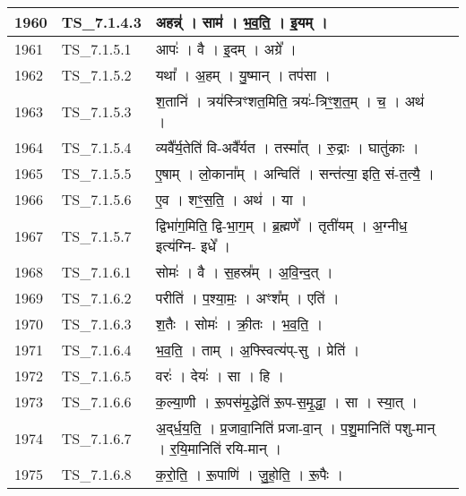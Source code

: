 \documentclass[17pt]{extarticle}
\begin{document}
\begin{longtable}{||p{0.4in}||p{0.9in}||p{4.0in}||p{0.9in}||}
        \hline
            1960 & TS\_7.1.4.3 & अहन्न्॑   ।   साम॑   ।   भ॒व॒ति॒   ।   इ॒यम्   ।    &      \\
        \hline
            1961 & TS\_7.1.5.1 & आपः॑   ।   वै   ।   इ॒दम्   ।   अग्रे᳚   ।    &      \\
        \hline
            1962 & TS\_7.1.5.2 & यथा᳚   ।   अ॒हम्   ।   यु॒ष्मान्   ।   तप॑सा   ।    &      \\
        \hline
            1963 & TS\_7.1.5.3 & श॒तानि॑   ।   त्रय॑स्त्रिꣳशत॒मिति॒ त्रयः॑{-}त्रिꣳ॒॒श॒त॒म्   ।   च॒   ।   अथ॑   ।    &      \\
        \hline
            1964 & TS\_7.1.5.4 & व्यवै᳚र्य॒तेति॑ वि{-}अवै᳚र्यत   ।   तस्मा᳚त्   ।   रु॒द्राः   ।   घातु॑काः   ।    &      \\
        \hline
            1965 & TS\_7.1.5.5 & ए॒षाम्   ।   लो॒काना᳚म्   ।   अन्विति॑   ।   सन्त॑त्या॒ इति॒ सं{-}त॒त्यै॒   ।    &      \\
        \hline
            1966 & TS\_7.1.5.6 & ए॒व   ।   शꣳ॒॒स॒ति॒   ।   अथ॑   ।   या   ।    &      \\
        \hline
            1967 & TS\_7.1.5.7 & द्विभा॑ग॒मिति॒ द्वि{-}भा॒ग॒म्   ।   ब्र॒ह्मणे᳚   ।   तृती॑यम्   ।   अ॒ग्नीध॒ इत्य॑ग्नि{-} इधे᳚   ।    &      \\
        \hline
            1968 & TS\_7.1.6.1 & सोमः॑   ।   वै   ।   स॒हस्र᳚म्   ।   अ॒वि॒न्द॒त्   ।    &      \\
        \hline
            1969 & TS\_7.1.6.2 & परीति॑   ।   प॒श्या॒मः॒   ।   अꣳश᳚म्   ।   एति॑   ।    &      \\
        \hline
            1970 & TS\_7.1.6.3 & श॒तैः   ।   सोमः॑   ।   क्री॒तः   ।   भ॒व॒ति॒   ।    &      \\
        \hline
            1971 & TS\_7.1.6.4 & भ॒व॒ति॒   ।   ताम्   ।   अ॒फ्स्वित्य॑प्{-}सु   ।   प्रेति॑   ।    &      \\
        \hline
            1972 & TS\_7.1.6.5 & वरः॑   ।   देयः॑   ।   सा   ।   हि   ।    &      \\
        \hline
            1973 & TS\_7.1.6.6 & क॒ल्या॒णी   ।   रू॒पस॑मृ॒द्धेति॑ रू॒प{-}स॒मृ॒द्धा॒   ।   सा   ।   स्या॒त्   ।    &      \\
        \hline
            1974 & TS\_7.1.6.7 & अ॒द्‌र्ध॒य॒ति॒   ।   प्र॒जावा॒निति॑ प्रजा{-}वा॒न्   ।   प॒शु॒मानिति॑ पशु{-}मान्   ।   र॒यि॒मानिति॑ रयि{-}मान्   ।    &      \\
        \hline
            1975 & TS\_7.1.6.8 & क॒रो॒ति॒   ।   रू॒पाणि॑   ।   जु॒हो॒ति॒   ।   रू॒पैः   ।    &      \\

\end{longtable}
\end{document}
